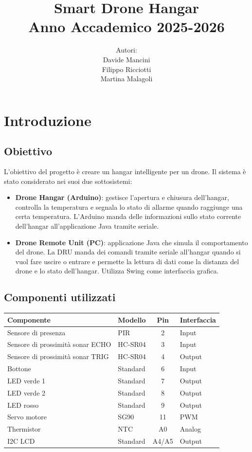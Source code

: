 \documentclass[a4paper,12pt]{report}
\title{
	Smart Drone Hangar\\
	\large Anno Accademico 2025-2026
}
\author {
	Autori:\\Davide Mancini\\Filippo Ricciotti\\Martina Malagoli
}
\begin{document}
\maketitle

\newpage

\tableofcontents

\chapter{Introduzione}

\section{Obiettivo}

L'obiettivo del progetto è creare un hangar intelligente per un drone. Il sistema è stato considerato nei suoi due sottosistemi:
\begin{itemize}
    \item \textbf{Drone Hangar (Arduino)}: gestisce l'apertura e chiusura dell'hangar, controlla la temperatura e segnala lo stato di allarme quando raggiunge una certa temperatura. L'Arduino manda delle informazioni sullo stato corrente dell'hangar all'applicazione Java tramite seriale.
    \item \textbf{Drone Remote Unit (PC)}: applicazione Java che simula il comportamento del drone. La DRU manda dei comandi tramite seriale all'hangar quando si vuol fare uscire o entrare e permette la lettura di dati come la distanza del drone e lo stato dell'hangar. Utilizza Swing come interfaccia grafica.
\end{itemize}

\section{Componenti utilizzati}

\begin{table}[H]
\centering
\begin{tabular}{|l|l|c|l|}
\hline
\textbf{Componente} & \textbf{Modello} & \textbf{Pin} & \textbf{Interfaccia} \\
\hline
Sensore di presenza & PIR & 2 & Input \\
\hline
Sensore di prossimità sonar ECHO & HC-SR04 & 3 & Input \\
\hline
Sensore di prossimità sonar TRIG & HC-SR04 & 4 & Output \\
\hline
Bottone & Standard & 6 & Input \\
\hline
LED verde 1 & Standard & 7 & Output \\
\hline
LED verde 2 & Standard & 8 & Output \\
\hline
LED rosso & Standard & 9 & Output \\
\hline
Servo motore & SG90 & 11 & PWM \\
\hline
Thermistor & NTC & A0 & Analog \\
\hline
I2C LCD & Standard & A4/A5 & Output \\
\hline
\end{tabular}
\end{table}
\end{document}
